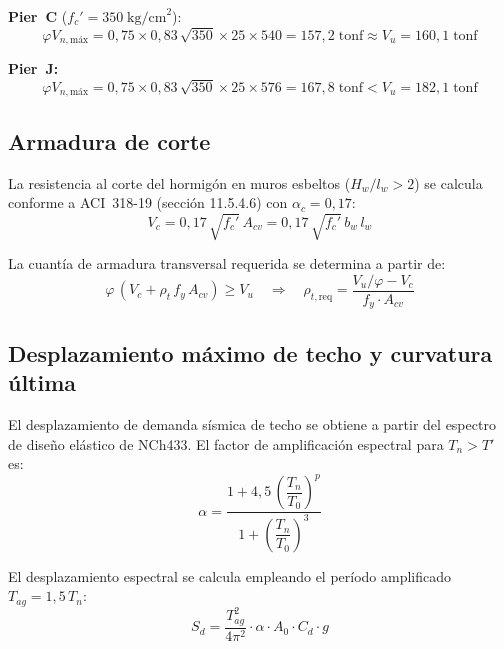 \textbf{Pier~C} ($f_c' = 350\;\text{kg/cm}^2$):
\begin{equation}
    \varphi V_{n,\text{máx}} = 0{,}75 \times 0{,}83\,\sqrt{350}\times 25 \times 540
    = 157{,}2\;\text{tonf} \approx V_u = 160{,}1\;\text{tonf}
\end{equation}

\textbf{Pier~J:}
\begin{equation}
    \varphi V_{n,\text{máx}} = 0{,}75 \times 0{,}83\,\sqrt{350}\times 25 \times 576
    = 167{,}8\;\text{tonf} < V_u = 182{,}1\;\text{tonf}
\end{equation}

\subsection{Armadura de corte}

La resistencia al corte del hormigón en muros esbeltos ($H_w/l_w > 2$) se calcula conforme
a ACI~318-19 (sección 11.5.4.6) con $\alpha_c = 0{,}17$:
\begin{equation}
    V_c = 0{,}17\,\sqrt{f_c'}\,A_{cv}
    = 0{,}17\,\sqrt{f_c'}\,b_w\,l_w
\end{equation}

La cuantía de armadura transversal requerida se determina a partir de:
\begin{equation}
    \varphi\,(V_c + \rho_t\,f_y\,A_{cv}) \geq V_u
    \quad \Rightarrow \quad
    \rho_{t,\text{req}} = \frac{V_u/\varphi - V_c}{f_y \cdot A_{cv}}
\end{equation}

\subsection{Desplazamiento máximo de techo y curvatura última}

El desplazamiento de demanda sísmica de techo se obtiene a partir del espectro de diseño
elástico de NCh433. El factor de amplificación espectral para $T_n > T'$ es:
\begin{equation}
    \alpha = \frac{1 + 4{,}5\,\left(\dfrac{T_n}{T_0}\right)^p}
                  {1 + \left(\dfrac{T_n}{T_0}\right)^3}
\end{equation}

El desplazamiento espectral se calcula empleando el período amplificado $T_{ag} = 1{,}5\,T_n$:
\begin{equation}
    S_d = \frac{T_{ag}^2}{4\pi^2}\cdot\alpha\cdot A_0\cdot C_d\cdot g
\end{equation}

